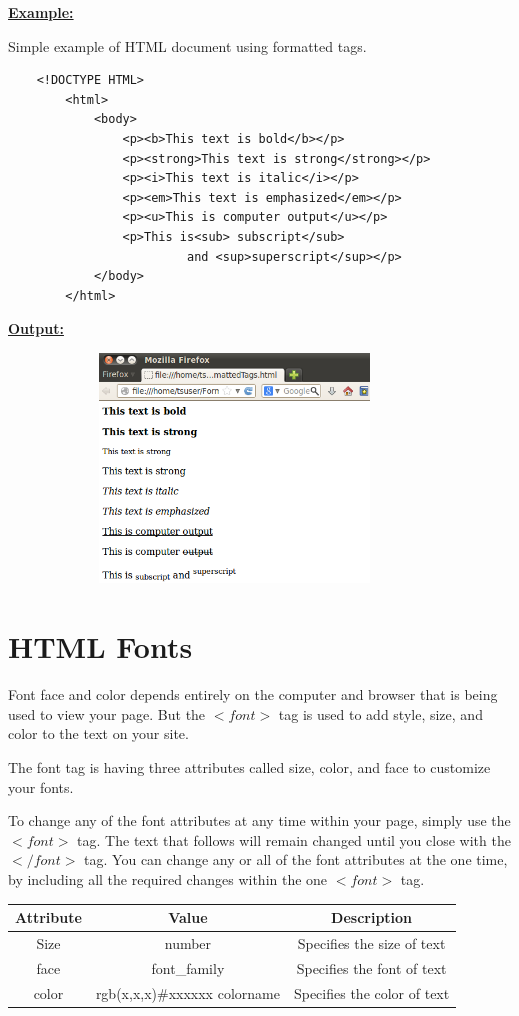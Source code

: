 \documentclass[11pt,a4paper]{article}
\begin{document}
\underline{\textbf{Example:}}

\hspace{1cm}Simple example of HTML document using formatted tags.
\begin{verbatim}
    <!DOCTYPE HTML>
        <html>
            <body>
                <p><b>This text is bold</b></p>
                <p><strong>This text is strong</strong></p>
                <p><i>This text is italic</i></p>
                <p><em>This text is emphasized</em></p>
                <p><u>This is computer output</u></p>
                <p>This is<sub> subscript</sub>
                         and <sup>superscript</sup></p>
            </body>
        </html>
\end{verbatim}

\underline{\textbf{Output:}}\

\includegraphics[height = 61mm, width = 120mm]{FormattedText.png}

\section*{HTML Fonts}
Font face and color depends entirely on the computer and browser that is being used to view your page. But the $<font>$ tag is used to add style, size, and color to the text on your site.\

The font tag is having three attributes called size, color, and face to customize your fonts.\

To change any of the font attributes at any time within your page, simply use the $<font>$ tag. The text that follows will remain changed until you close with the $</font>$ tag. You can change any or all of the font attributes at the one time, by including all the required changes within the one $<font>$ tag.\

\begin{center}
\begin{tabular}{| c | c | c |}\hline
\textbf{Attribute} & \textbf{Value} & \textbf{Description} \\ \hline
Size & number & Specifies the size of text \\ \hline
face & font\_family & Specifies the font of text \\ \hline
color & rgb(x,x,x)\#xxxxxx colorname & Specifies the color of text\\ \hline
\end{tabular}
\end{center}
\end{document}
